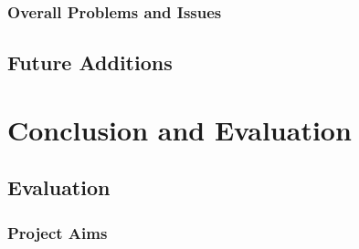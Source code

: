 \documentclass[a4paper,10pt]{report}
\begin{document}
\subsection{Overall Problems and Issues}
\section{Future Additions}

\chapter{Conclusion and Evaluation}
\section{Evaluation}
\subsection{Project Aims}


\clearpage


\end{document}
